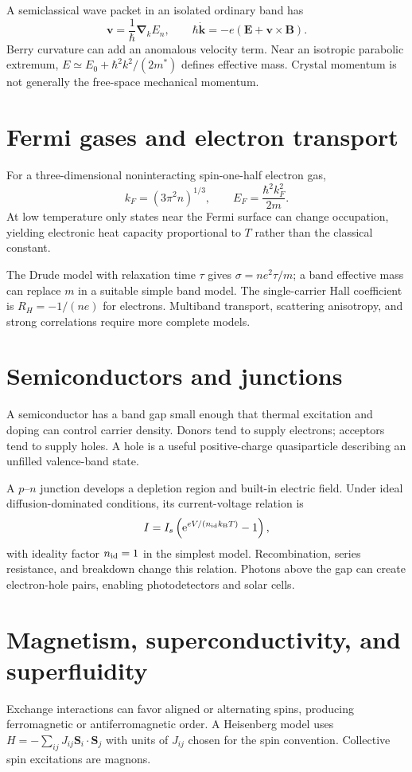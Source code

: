 \documentclass[11pt,oneside]{book}
\newcommand{\ee}{\mathrm{e}}
\newcommand{\vect}[1]{\boldsymbol{#1}}
\newcommand{\grad}{\boldsymbol{\nabla}}
\newcommand{\kb}{k_{\mathrm B}}
\theoremstyle{reviewstyle}
\begin{document}
A semiclassical wave packet in an isolated ordinary band has
\begin{equation}\vect v=\frac1\hbar\grad_{\!k}E_n,\qquad \hbar\dot{\vect k}=-e(\vect E+\vect v\times\vect B).\end{equation}
Berry curvature can add an anomalous velocity term. Near an isotropic parabolic extremum, $E\simeq E_0+\hbar^2k^2/(2m^*)$ defines effective mass. Crystal momentum is not generally the free-space mechanical momentum.
\section{Fermi gases and electron transport}
For a three-dimensional noninteracting spin-one-half electron gas,
\begin{equation}k_F=(3\pi^2n)^{1/3},\qquad E_F=\frac{\hbar^2k_F^2}{2m}.\end{equation}
At low temperature only states near the Fermi surface can change occupation, yielding electronic heat capacity proportional to $T$ rather than the classical constant.

The Drude model with relaxation time $\tau$ gives $\sigma=ne^2\tau/m$; a band effective mass can replace $m$ in a suitable simple band model. The single-carrier Hall coefficient is $R_H=-1/(ne)$ for electrons. Multiband transport, scattering anisotropy, and strong correlations require more complete models.
\section{Semiconductors and junctions}
A semiconductor has a band gap small enough that thermal excitation and doping can control carrier density. Donors tend to supply electrons; acceptors tend to supply holes. A hole is a useful positive-charge quasiparticle describing an unfilled valence-band state.

A $p$--$n$ junction develops a depletion region and built-in electric field. Under ideal diffusion-dominated conditions, its current-voltage relation is
\begin{equation}I=I_s\left(\ee^{eV/(n_{\rm id}\kb T)}-1\right),\end{equation}
with ideality factor $n_{\rm id}=1$ in the simplest model. Recombination, series resistance, and breakdown change this relation. Photons above the gap can create electron-hole pairs, enabling photodetectors and solar cells.
\section{Magnetism, superconductivity, and superfluidity}
Exchange interactions can favor aligned or alternating spins, producing ferromagnetic or antiferromagnetic order. A Heisenberg model uses $H=-\sum_{ij}J_{ij}\vect S_i\cdot\vect S_j$ with units of $J_{ij}$ chosen for the spin convention. Collective spin excitations are magnons.
\end{document}
